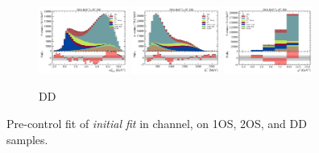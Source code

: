 \begin{figure}[htb]
    \begin{subfigure}{\textwidth}
        \includegraphics[width=0.32\textwidth]{./figs-supplemental-plots/init-fit/pre-ctrl/fit_result-stacked-D0-dd-mmiss2.pdf}
        \includegraphics[width=0.32\textwidth]{./figs-supplemental-plots/init-fit/pre-ctrl/fit_result-stacked-D0-dd-el.pdf}
        \includegraphics[width=0.32\textwidth]{./figs-supplemental-plots/init-fit/pre-ctrl/fit_result-stacked-D0-dd-q2.pdf}
        \caption{DD}
    \end{subfigure}
    \caption{
        Pre-control fit of \emph{initial fit} in \Dz channel,
        on 1OS, 2OS, and DD samples.
    }
    \label{fig:init-fit-pre-ctrl-d0}
\end{figure}

